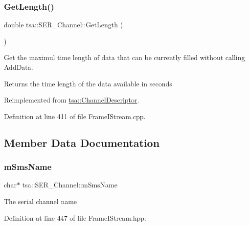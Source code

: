 \subsubsection{\texorpdfstring{Get\+Length()}{GetLength()}}
{\footnotesize\ttfamily double tsa\+::\+S\+E\+R\+\_\+\+Channel\+::\+Get\+Length (\begin{DoxyParamCaption}{ }\end{DoxyParamCaption})\hspace{0.3cm}{\ttfamily [virtual]}}

Get the maximul time length of data that can be currently filled without calling Add\+Data.

\begin{DoxyReturn}{Returns}
the time length of the data available in seconds 
\end{DoxyReturn}


Reimplemented from \hyperlink{classtsa_1_1_channel_descriptor_a456d14e6136c389fbd307fabab7d7b73}{tsa\+::\+Channel\+Descriptor}.



Definition at line 411 of file Frame\+I\+Stream.\+cpp.



\subsection{Member Data Documentation}
\mbox{\label{classtsa_1_1_s_e_r___channel_ab132f8f0cd0652f3fb43b24d2ec9590c}} 
\subsubsection{\texorpdfstring{m\+Sms\+Name}{mSmsName}}
{\footnotesize\ttfamily char$\ast$ tsa\+::\+S\+E\+R\+\_\+\+Channel\+::m\+Sms\+Name\hspace{0.3cm}{\ttfamily [private]}}

The serial channel name 

Definition at line 447 of file Frame\+I\+Stream.\+hpp.

\mbox{\label{classtsa_1_1_s_e_r___channel_a6967202b96d336dbbef38b67724cf295}} 
